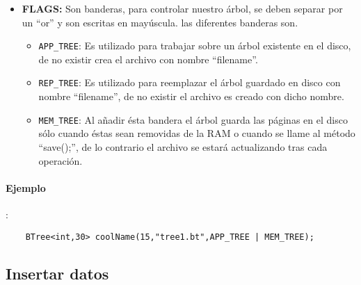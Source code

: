 \documentclass{book}
\begin{document}
\begin{itemize}
\item {\bf FLAGS:} Son banderas, para controlar nuestro árbol, se deben separar por un ``or'' y son escritas en mayúscula.
las diferentes banderas son.\\
\begin{itemize}
\item \verb+APP_TREE+: Es utilizado para trabajar sobre un árbol existente en el disco, de no existir crea el archivo con nombre ``filename''.\\
\item \verb+REP_TREE+: Es utilizado para reemplazar el árbol guardado en disco con nombre ``filename'', de no existir el archivo es creado con dicho nombre.
\item \verb+MEM_TREE+: Al añadir ésta bandera el árbol guarda las páginas en el disco sólo cuando éstas sean removidas de la RAM o cuando se llame al método ``save();'', de lo contrario el archivo se estará actualizando tras cada operación.

\end{itemize}

\end{itemize}

\paragraph{Ejemplo}:\\

\begin{verbatim}
    BTree<int,30> coolName(15,"tree1.bt",APP_TREE | MEM_TREE);
\end{verbatim}

\subsection{Insertar datos}
\end{document}
